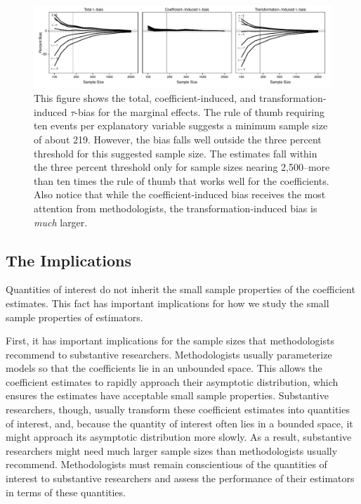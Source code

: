 \documentclass[12pt]{article}
\begin{document}
\begin{figure}[h!]
\begin{center}
\includegraphics[width = \textwidth]{figs/bias-me.pdf}
\caption{This figure shows the total, coefficient-induced, and transformation-induced $\tau$-bias for the marginal effects. The rule of thumb requiring ten events per explanatory variable suggests a minimum sample size of about 219. However, the bias falls well outside the three percent threshold for this suggested sample size. The estimates fall within the three percent threshold only for sample sizes nearing 2,500--more than ten times the rule of thumb that works well for the coefficients. Also notice that while the coefficient-induced bias receives the most attention from methodologists, the transformation-induced bias is \textit{much} larger.}\label{fig:bias-me}
\end{center}
\end{figure}

\subsection*{The Implications}

Quantities of interest do not inherit the small sample properties of the coefficient estimates.
This fact has important implications for how we study the small sample properties of estimators. 

First, it has important implications for the sample sizes that methodologists recommend to substantive researchers. 
Methodologists usually parameterize models so that the coefficients lie in an unbounded space. 
This allows the coefficient estimates to rapidly approach their asymptotic distribution, which ensures the estimates have acceptable small sample properties. 
Substantive researchers, though, usually transform these coefficient estimates into quantities of interest, and, because the quantity of interest often lies in a bounded space, it might approach its asymptotic distribution more slowly. 
As a result, substantive researchers might need much larger sample sizes than methodologists usually recommend. Methodologists must remain conscientious of the quantities of interest to substantive researchers and assess the performance of their estimators in terms of these quantities.
\end{document}
